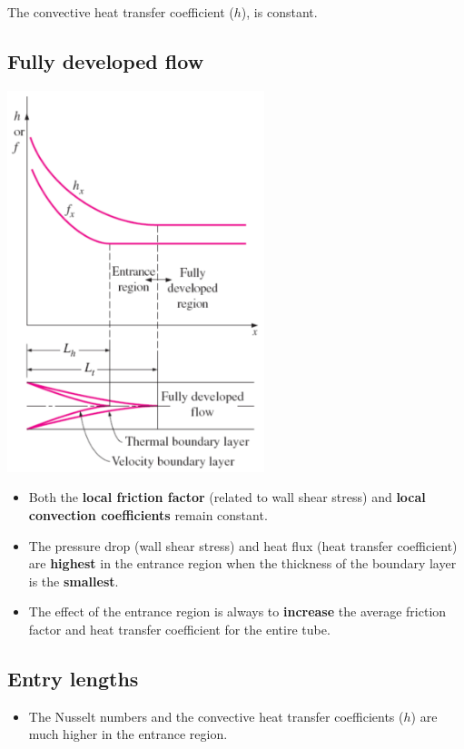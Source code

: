 \documentclass[11pt]{article}
\begin{document}
The convective heat transfer coefficient (\(h\)), is constant.
\subsection{Fully developed flow}
\label{sec:org63488bb}
\begin{center}
\includegraphics[height=30em]{./images/fully-developed-flow-diagram.png}
\end{center}
\begin{itemize}
\item Both the \textbf{local friction factor} (related to wall shear stress) and \textbf{local convection coefficients} remain constant.
\item The pressure drop (wall shear stress) and heat flux (heat transfer coefficient) are \textbf{highest} in the entrance region when the thickness of the boundary layer is the \textbf{smallest}.
\item The effect of the entrance region is always to \textbf{increase} the average friction factor and heat transfer coefficient for the entire tube.
\end{itemize}
\subsection{Entry lengths}
\label{sec:org8744965}
\begin{itemize}
\item The Nusselt numbers and the convective heat transfer coefficients (\(h\)) are much higher in the entrance region.
\end{itemize}
\end{document}
